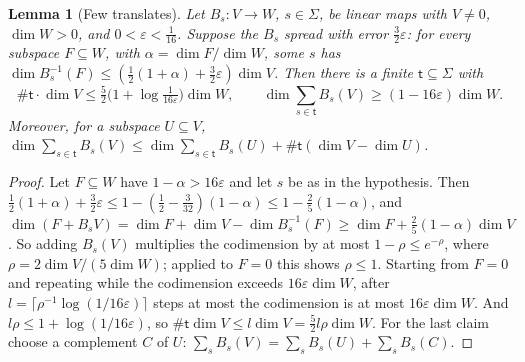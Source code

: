 \documentclass[10pt]{amsart}
\newtheorem{lemma}[theorem]{Lemma}
\theoremstyle{definition}
\theoremstyle{remark}
\begin{document}
\begin{lemma}[Few translates]\label{au:few}
Let $B_s\colon V\to W$, $s\in\Sigma$, be linear maps with $V\ne0$, $\dim W>0$, and
$0<\varepsilon<\tfrac1{16}$. Suppose the $B_s$ \emph{spread with error $\tfrac32\varepsilon$}: for
every subspace $F\subseteq W$, with $\alpha=\dim F/\dim W$, some $s$ has
$\dim B_s^{-1}(F)\le(\tfrac12(1+\alpha)+\tfrac32\varepsilon)\dim V$. Then there is a finite
$\mathsf t\subseteq\Sigma$ with
\[
\#\mathsf t\cdot\dim V\le\tfrac52\bigl(1+\log\tfrac1{16\varepsilon}\bigr)\dim W,\qquad
\dim\sum_{s\in\mathsf t}B_s(V)\ge(1-16\varepsilon)\dim W .
\]
Moreover, for a subspace $U\subseteq V$,
$\dim\sum_{s\in\mathsf t}B_s(V)\le\dim\sum_{s\in\mathsf t}B_s(U)+\#\mathsf t(\dim V-\dim U)$.
\end{lemma}
\begin{proof}
Let $F\subseteq W$ have $1-\alpha>16\varepsilon$ and let $s$ be as in the hypothesis. Then
$\tfrac12(1+\alpha)+\tfrac32\varepsilon\le1-(\tfrac12-\tfrac3{32})(1-\alpha)\le1-\tfrac25(1-
\alpha)$, and $\dim(F+B_sV)=\dim F+\dim V-\dim B_s^{-1}(F)\ge\dim F+\tfrac25(1-\alpha)\dim V$. So
adding $B_s(V)$ multiplies the codimension by at most $1-\rho\le e^{-\rho}$, where
$\rho=2\dim V/(5\dim W)$; applied to $F=0$ this shows $\rho\le1$. Starting from $F=0$ and
repeating while the codimension exceeds $16\varepsilon\dim W$, after
$l=\lceil\rho^{-1}\log(1/16\varepsilon)\rceil$ steps at most the codimension is at most
$16\varepsilon\dim W$. And $l\rho\le1+\log(1/16\varepsilon)$, so
$\#\mathsf t\dim V\le l\dim V=\tfrac52l\rho\dim W$. For the last claim choose a complement $C$ of
$U$: $\sum_sB_s(V)=\sum_sB_s(U)+\sum_sB_s(C)$.
\end{proof}
\end{document}
